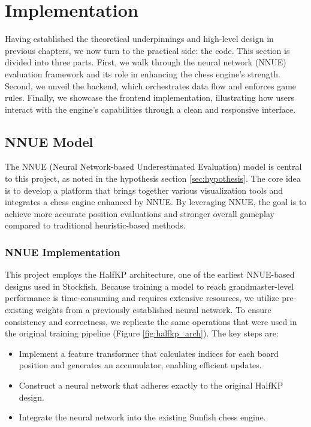 \documentclass[12pt,a4paper]{article}
\begin{document}
\section{Implementation}
Having established the theoretical underpinnings and high-level design in previous chapters, we now turn to the practical side: the code. This section is divided into three parts. First, we walk through the neural network (NNUE) evaluation framework and its role in enhancing the chess engine’s strength. Second, we unveil the backend, which orchestrates data flow and enforces game rules. Finally, we showcase the frontend implementation, illustrating how users interact with the engine’s capabilities through a clean and responsive interface.
\subsection{NNUE Model}
\label{subsec:nnue_model}

The NNUE (Neural Network-based Underestimated Evaluation) model is central to this project, as noted in the hypothesis section \ref{sec:hypothesis}. The core idea is to develop a platform that brings together various visualization tools and integrates a chess engine enhanced by NNUE. By leveraging NNUE, the goal is to achieve more accurate position evaluations and stronger overall gameplay compared to traditional heuristic-based methods.

\subsubsection{NNUE Implementation}
\label{subsubsec:nnue_implementation}

This project employs the HalfKP architecture, one of the earliest NNUE-based designs used in Stockfish. Because training a model to reach grandmaster-level performance is time-consuming and requires extensive resources, we utilize pre-existing weights from a previously established neural network. To ensure consistency and correctness, we replicate the same operations that were used in the original training pipeline (Figure \ref{fig:halfkp_arch}). The key steps are:

\begin{itemize}
    \item Implement a feature transformer that calculates indices for each board position and generates an accumulator, enabling efficient updates.
    \item Construct a neural network that adheres exactly to the original HalfKP design.
    \item Integrate the neural network into the existing Sunfish chess engine.
\end{itemize}
\end{document}
